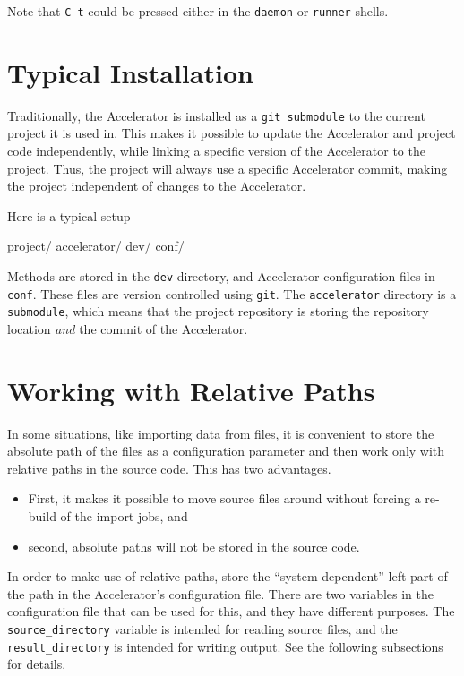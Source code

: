 Note that \texttt{C-t} could be pressed either in the \texttt{daemon}
or \texttt{runner} shells.



\clearpage

\section{Typical Installation}
Traditionally, the Accelerator is installed as a \texttt{git
submodule} to the current project it is used in.  This makes it
possible to update the Accelerator and project code independently,
while linking a specific version of the Accelerator to the project.
Thus, the project will always use a specific Accelerator commit,
making the project independent of changes to the Accelerator.

Here is a typical setup
\begin{shell}
project/
    accelerator/
    dev/
    conf/
\end{shell}
Methods are stored in the \texttt{dev} directory, and Accelerator
configuration files in \texttt{conf}.  These files are version
controlled using \texttt{git}.  The \texttt{accelerator} directory is
a \texttt{submodule}, which means that the project repository is
storing the repository location \textsl{and} the commit of the
Accelerator.


\clearpage

\section{Working with Relative Paths}

In some situations, like importing data from files, it is convenient
to store the absolute path of the files as a configuration parameter
and then work only with relative paths in the source code.  This has
two advantages.
\begin{itemize}
\item[] First, it makes it possible to move source files around without
forcing a re-build of the import jobs, and
\item[] second, absolute paths will not be stored in the source code.
\end{itemize}
In order to make use of relative paths, store the ``system dependent''
left part of the path in the Accelerator's configuration file.  There
are two variables in the configuration file that can be used for this,
and they have different purposes.  The \texttt{source\_directory}
variable is intended for reading source files, and
the \texttt{result\_directory} is intended for writing output.  See
the following subsections for details.


